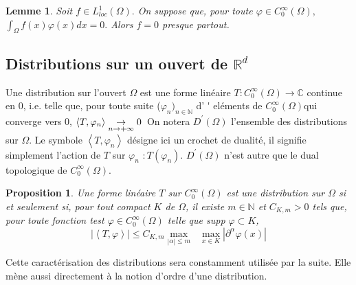 \documentclass[3pt]{article}
\newtheorem{lemma}[theorem]{Lemme}
\newtheorem{proposition}[theorem]{Proposition}
\begin{document}
\bigskip 

\begin{lemma}
Soit $f\in L_{loc}^{1}(\Omega ).$ On suppose que, pour toute $\varphi \in
C_{0}^{\infty }(\Omega ),$ $\int_{\Omega }f(x)\varphi (x)dx=0.$ Alors $f=0$
presque partout.
\end{lemma}

\bigskip 

\subsection{Distributions sur un ouvert de $\mathbb{R}^{d}$}

\bigskip 

Une distribution sur l'ouvert $\Omega $ est une forme lin\'{e}aire $%
T:C_{0}^{\infty }(\Omega )\rightarrow \mathbb{C}$ continue en $0$, i.e.
telle que, pour toute suite ($\varphi _{n})_{n\in \mathbb{N}}$ d'%
\'{}%
el\'{e}ments de $C_{0}^{\infty }(\Omega )$qui converge vers $0$, $%
\left\langle T,\varphi _{n}\right\rangle \underset{n\rightarrow +\infty }{%
\rightarrow }0$\ On notera $D^{\prime }(\Omega )$ l'ensemble des
distributions sur $\Omega $. Le symbole $\left\langle T,\varphi
_{n}\right\rangle $ d\'{e}signe ici un crochet de dualit\'{e}, il signifie
simplement l'action de $T$ sur $\varphi _{n}$ $:T(\varphi _{n})$. $D^{\prime
}(\Omega )$ n'est autre que le dual topologique de $C_{0}^{\infty }(\Omega ).
$

\bigskip 

\begin{proposition}
Une forme lin\'{e}aire $T$ sur $C_{0}^{\infty }(\Omega )$ est une
distribution sur $\Omega $ si et seulement si, pour tout compact $K$ de $%
\Omega $, il existe $m\in \mathbb{N}$ et $C_{K,m}>0$ tels que, pour toute
fonction test $\varphi \in C_{0}^{\infty }(\Omega )$ telle que supp $\varphi
\subset K$,%
\begin{equation*}
\left\vert \left\langle T,\varphi \right\rangle \right\vert \leq C_{K,m}%
\underset{\left\vert \alpha \right\vert \leq m}{\max }\text{ }\underset{x\in
K}{\max }\left\vert \partial ^{\alpha }\varphi (x)\right\vert 
\end{equation*}
\end{proposition}

\bigskip 

Cette caract\'{e}risation des distributions sera constamment utilis\'{e}e
par la suite. Elle m\`{e}ne aussi directement \`{a} la notion d'ordre d'une
distribution.
\end{document}
